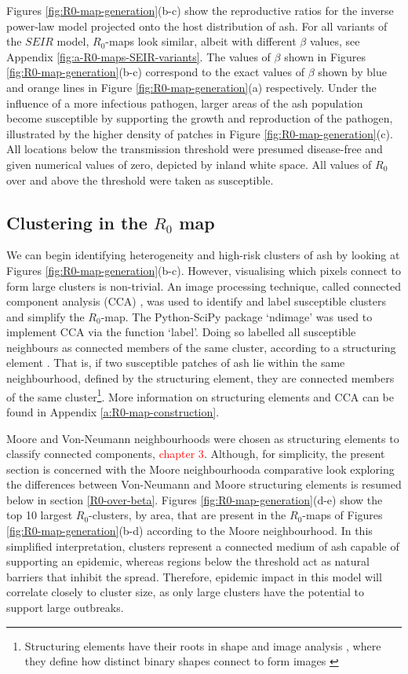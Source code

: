 Figures \ref{fig:R0-map-generation}(b-c) show the reproductive ratios for the inverse power-law model projected onto the host distribution of ash. For all variants of the $SEIR$ model, $R_0$-maps look similar, albeit with different $\beta$ values, see Appendix \ref{fig:a-R0-maps-SEIR-variants}. The values of $\beta$ shown in Figures \ref{fig:R0-map-generation}(b-c) correspond to the exact values of $\beta$ shown by blue and orange lines in Figure \ref{fig:R0-map-generation}(a) respectively. Under the influence of a more infectious pathogen, larger areas of the ash population become susceptible by supporting the growth and reproduction of the pathogen, illustrated by the higher density of patches in Figure \ref{fig:R0-map-generation}(c). All locations below the transmission threshold were presumed disease-free and given numerical values of zero, depicted by inland white space. All values of $R_0$ over and above the threshold were taken as susceptible. 

\subsection{Clustering in the $R_0$ map}

We can begin identifying heterogeneity and high-risk clusters of ash by looking at Figures \ref{fig:R0-map-generation}(b-c). However, visualising which pixels connect to form large clusters is non-trivial. An image processing technique, called connected component analysis (CCA) \cite{CCA1, CCA2}, was used to identify and label susceptible clusters and simplify the $R_0$-map. The Python-SciPy package `ndimage' \cite{scipy} was used to implement CCA via the function `label'. Doing so labelled all susceptible neighbours as connected members of the same cluster, according to a structuring element \cite{liang1989erosion}. That is, if two susceptible patches of ash lie within the same neighbourhood, defined by the structuring element, they are connected members of the same cluster\footnote{Structuring elements have their roots in shape and image analysis \cite{23111}, where they define how distinct binary shapes connect to form images \cite{liang1989erosion, nachtegael2001connections}}. More information on structuring elements and CCA can be found in Appendix \ref{a:R0-map-construction}.

Moore and Von-Neumann neighbourhoods were chosen as structuring elements to classify connected components, \textcolor{red}{chapter 3}. Although, for simplicity, the present section is concerned with the Moore neighbourhood\textemdash a comparative look exploring the differences between Von-Neumann and Moore structuring elements is resumed below in section \ref{R0-over-beta}. Figures \ref{fig:R0-map-generation}(d-e) show the top 10 largest $R_0$-clusters, by area, that are present in the $R_0$-maps of Figures \ref{fig:R0-map-generation}(b-d) according to the Moore neighbourhood.
In this simplified interpretation, clusters represent a connected medium of ash capable of supporting an epidemic, whereas regions below the threshold act as natural barriers that inhibit the spread. Therefore, epidemic impact in this model will correlate closely to cluster size, as only large clusters have the potential to support large outbreaks. 

